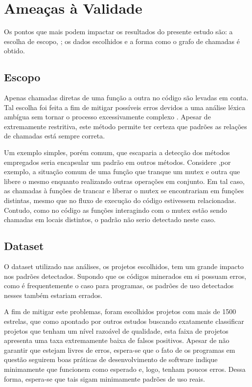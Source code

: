 \section{Ameaças à Validade}
Os pontos que mais podem impactar os resultados do presente estudo são: a
escolha de escopo, ; os dados escolhidos e a forma como o grafo de chamadas é obtido.

\subsection{Escopo}
Apenas chamadas diretas de uma função a outra no código são levadas em conta.
Tal escolha foi feita a fim de mitigar possíveis erros devidos a uma análise
léxica ambígua sem tornar o processo excessivamente complexo . Apesar de
extremamente restritiva, este método permite ter certeza que padrões as relações
de chamadas está sempre correta. 

Um exemplo simples, porém comum, que escaparia a detecção dos métodos empregados
seria encapsular um padrão em outros métodos. Considere ,por exemplo, a situação
comum de uma função que tranque um mutex e outra que libere o mesmo enquanto
realizando outras operações em conjunto. Em tal caso, as chamadas à funções de
trancar e liberar o mutex se encontrariam em funções distintas, mesmo que no
fluxo de execução do código estivessem relacionadas. Contudo, como no código
as funções interagindo com o mutex estão sendo chamadas em locais distintos, o
padrão não serio detectado neste caso.

\subsection{Dataset}
O dataset utilizado nas análises, os projetos escolhidos, tem um grande impacto
nos padrões detectados. Supondo que os códigos minerados em si possuam erros,
como é frequentemente o caso para programas, os padrões de uso detectados nesses
também estariam errados. 

A fim de mitigar este problemas, foram escolhidos projetos com mais de 1500
estrelas, que como apontado por outros estudos \cite{comp_mining_source_code}
buscando exatamente classificar projetos que tenham um nível razoável de
qualidade, esta faixa de projetos apresenta uma taxa extremamente baixa de
falsos positivos. Apesar de não garantir que estejam livres de erros, espera-se
que o fato de os programas em questão seguirem boas práticas de desenvolvimento
de software indique minimamente que funcionem como esperado e, logo, tenham
poucos erros. Dessa forma, espera-se que tais sigam minimamente padrões de uso
reais. 

